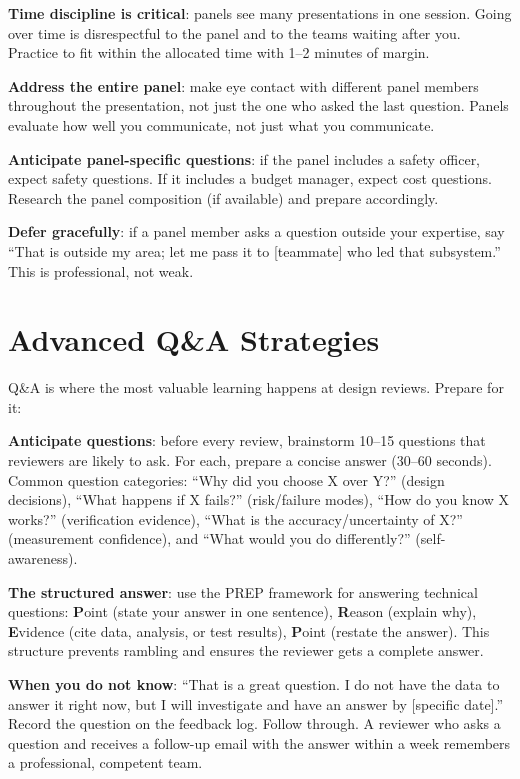 \textbf{Time discipline is critical}: panels see many presentations in one session. Going over time is disrespectful to the panel and to the teams waiting after you. Practice to fit within the allocated time with 1--2 minutes of margin.

\textbf{Address the entire panel}: make eye contact with different panel members throughout the presentation, not just the one who asked the last question. Panels evaluate how well you communicate, not just what you communicate.

\textbf{Anticipate panel-specific questions}: if the panel includes a safety officer, expect safety questions. If it includes a budget manager, expect cost questions. Research the panel composition (if available) and prepare accordingly.

\textbf{Defer gracefully}: if a panel member asks a question outside your expertise, say ``That is outside my area; let me pass it to [teammate] who led that subsystem.'' This is professional, not weak.



\section{Advanced Q\&A Strategies}
Q\&A is where the most valuable learning happens at design reviews. Prepare for it:

\textbf{Anticipate questions}: before every review, brainstorm 10--15 questions that reviewers are likely to ask. For each, prepare a concise answer (30--60 seconds). Common question categories: ``Why did you choose X over Y?'' (design decisions), ``What happens if X fails?'' (risk/failure modes), ``How do you know X works?'' (verification evidence), ``What is the accuracy/uncertainty of X?'' (measurement confidence), and ``What would you do differently?'' (self-awareness).

\textbf{The structured answer}: use the PREP framework for answering technical questions: \textbf{P}oint (state your answer in one sentence), \textbf{R}eason (explain why), \textbf{E}vidence (cite data, analysis, or test results), \textbf{P}oint (restate the answer). This structure prevents rambling and ensures the reviewer gets a complete answer.

\textbf{When you do not know}: ``That is a great question. I do not have the data to answer it right now, but I will investigate and have an answer by [specific date].'' Record the question on the feedback log. Follow through. A reviewer who asks a question and receives a follow-up email with the answer within a week remembers a professional, competent team.

